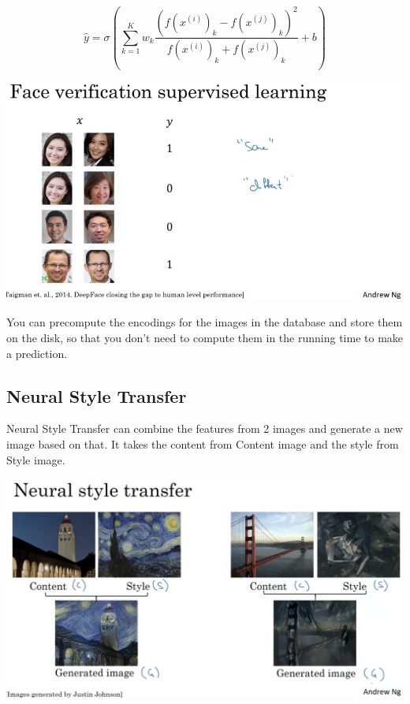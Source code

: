 \documentclass{article}
\begin{document}
\[\hat{y} = \sigma(\sum_{k = 1}^{K} w_{k} \frac{(f(x^{(i)})_{k} - f(x^{(j)})_{k})^{2}}{f(x^{(i)})_{k} + f(x^{(j)})_{k}} + b)\]

\begin{center}
\includegraphics[scale=0.4]{./images/face_verification_binary_train.png}
\end{center}

\noindent You can precompute the encodings for the images in the database and store them on the disk, so that you don't need to compute them in the running time to make a prediction.

\subsection{Neural Style Transfer}

\noindent Neural Style Transfer can combine the features from 2 images and generate a new image based on that. It takes the content from Content image and the style from Style image.

\begin{center}
\includegraphics[scale=0.4]{./images/neural_style_transfer.png}
\end{center}
\end{document}
